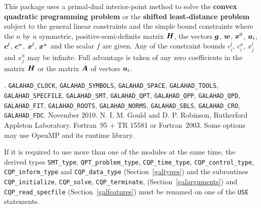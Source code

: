 \documentclass{galahad}
\newcommand{\packagename}{CQP}
\newcommand{\fullpackagename}{\libraryname\_\packagename}
\begin{document}
\galheader


\galsummary
This package uses a primal-dual interior-point method
to solve the {\bf convex quadratic programming problem}
or the {\bf shifted least-distance problem}
subject to the general linear constraints
and the simple bound constraints
where the $n$ by $n$ symmetric, positive-semi-definite matrix ${\bm{H}}$, the
vectors ${\bm{g}}$, ${\bm{w}}$, ${\bm{x}}^{0}$,
${\bm{a}}_{i}$, ${\bm{c}}^{l}$, ${\bm{c}}^{u}$, ${\bm{x}}^{l}$,
${\bm{x}}^{u}$ and the scalar $f$ are given.
Any of the constraint bounds $c_{i}^{l}$, $c_{i}^{u}$,
$x_{j}^{l}$ and $x_{j}^{u}$ may be infinite.
Full advantage is taken of any zero coefficients in the matrix ${\bm{H}}$
or the matrix ${\bm{A}}$ of vectors ${\bm{a}}_{i}$.


\galattributes
\galversions{\tt  \fullpackagename\_single, \fullpackagename\_double}.
\galuses
{\tt GALAHAD\_CLOCK},
{\tt GALAHAD\_SY\-M\-BOLS},
{\tt GALAHAD\-\_SPACE},
{\tt GALAHAD\_TOOLS},
{\tt GALAHAD\_SPECFILE},
{\tt GALAHAD\_SMT},
{\tt GALAHAD\_QPT},
{\tt GALAHAD\_QPP},
{\tt GALAHAD\_\-QPD},
{\tt GALAHAD\_\-FIT},
{\tt GALAHAD\_\-ROOTS},
{\tt GALAHAD\_\-NORMS},
{\tt GALAHAD\_\-SBLS},
{\tt GALAHAD\_\-CRO},
{\tt GALAHAD\_FDC}.
\galdate November 2010.
\galorigin N. I. M. Gould and D. P. Robinson, Rutherford Appleton Laboratory.
\gallanguage Fortran~95 + TR 15581 or Fortran~2003.
\galparallelism Some options may use OpenMP and its runtime library.


\galhowto




\noindent
If it is required to use more than one of the modules at the same time, 
the derived types
{\tt SMT\_type},
{\tt QPT\_problem\_type},
{\tt \packagename\_time\_type},
{\tt \packagename\_control\_type},
{\tt \packagename\_inform\_type}
and
{\tt \packagename\_data\_type}
(Section~\ref{galtypes})
and the subroutines
{\tt \packagename\_initialize},
{\tt \packagename\_\-solve},
{\tt \packagename\_terminate},
(Section~\ref{galarguments})
and
{\tt \packagename\_read\_specfile}
(Section~\ref{galfeatures})
must be renamed on one of the {\tt USE} statements.
\end{document}
